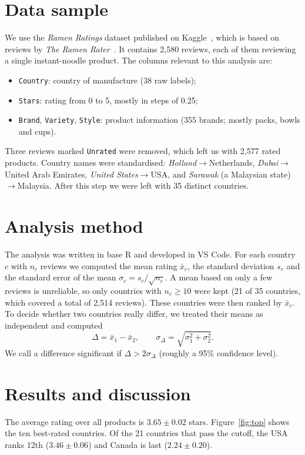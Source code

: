 \documentclass{article}
\begin{document}
\section*{Data sample}
We use the \emph{Ramen Ratings} dataset published on
Kaggle~\cite{kaggle}, which is based on reviews by
\emph{The Ramen Rater}~\cite{ramenrater}. It contains 2{,}580 reviews, each of them reviewing a single instant-noodle product. The columns relevant to this analysis are:
\begin{itemize}
  \setlength\itemsep{0em}
  \item \texttt{Country}: country of manufacture (38 raw labels);
  \item \texttt{Stars}: rating from 0 to 5, mostly in steps of 0.25;
  \item \texttt{Brand}, \texttt{Variety}, \texttt{Style}: product
        information (355 brands; mostly packs, bowls and cups).
\end{itemize}
Three reviews marked \texttt{Unrated} were removed, which left us with
2{,}577 rated products. Country names were standardised: \emph{Holland}$\to$Netherlands,
\emph{Dubai}$\to$United Arab Emirates, \emph{United States}$\to$USA, and
\emph{Sarawak} (a Malaysian state)$\to$Malaysia. After this step we were left with 35 distinct countries.

\section*{Analysis method}
The analysis was written in base R and developed in VS Code. For each country
$c$ with $n_c$ reviews we computed the mean rating $\bar{x}_c$, the standard
deviation $s_c$ and the standard error of the mean
$\sigma_c = s_c/\sqrt{n_c}$. A mean based on only a few reviews is unreliable,
so only countries with $n_c \geq 10$ were kept (21 of 35 countries, which
covered a total of 2{,}514 reviews). These countries were then ranked by
$\bar{x}_c$. To decide whether two countries really differ, we treated their
means as independent and computed
\begin{equation}
  \Delta = \bar{x}_1 - \bar{x}_2, \qquad
  \sigma_\Delta = \sqrt{\sigma_1^2 + \sigma_2^2}.
\end{equation}
We call a difference significant if $\Delta > 2\sigma_\Delta$ (roughly a
95\% confidence level).

\section*{Results and discussion}
The average rating over all products is $3.65 \pm 0.02$ stars.
Figure~\ref{fig:top} shows the ten best-rated countries. Of the 21 countries
that pass the cutoff, the USA ranks 12th ($3.46\pm0.06$) and Canada is last
($2.24\pm0.20$).
\end{document}

